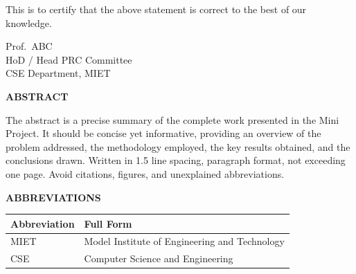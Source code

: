 \documentclass[12pt,a4paper]{report}
\newcommand{\hodname}{Prof.\ ABC}
\numberwithin{equation}{chapter}
\begin{document}
\vspace{2cm}

\noindent
This is to certify that the above statement is correct to the best of our knowledge.

\vspace{1.5cm}

\noindent
\hodname\\
HoD / Head PRC Committee\\
CSE Department, MIET

\newpage
\begin{center}
{\fontsize{16}{19}\selectfont \textbf{ABSTRACT}}
\end{center}

\vspace{1cm}

\noindent
The abstract is a precise summary of the complete work presented in the Mini Project.
It should be concise yet informative, providing an overview of the problem addressed,
the methodology employed, the key results obtained, and the conclusions drawn.
Written in 1.5 line spacing, paragraph format, not exceeding one page.
Avoid citations, figures, and unexplained abbreviations.

\newpage
\tableofcontents

\newpage
\listoftables
{}

\newpage
\listoffigures
{}

\newpage
\begin{center}
{\fontsize{16}{19}\selectfont \textbf{ABBREVIATIONS}}
\end{center}

\vspace{1cm}

\noindent
\begin{longtable}{@{} p{3cm} p{11cm} @{}}
\textbf{Abbreviation} & \textbf{Full Form} \\
\midrule
\endhead
MIET  & Model Institute of Engineering and Technology \\
CSE   & Computer Science and Engineering \\
\end{longtable}
\end{document}
